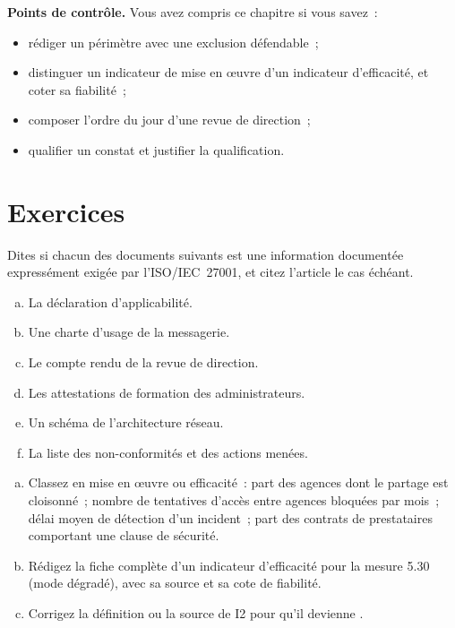 \begin{boxinfo}
\textbf{Points de contrôle.} Vous avez compris ce chapitre si vous savez~:
\begin{itemize}
    \item rédiger un périmètre avec une exclusion défendable~;
    \item distinguer un indicateur de mise en œuvre d'un indicateur
          d'efficacité, et coter sa fiabilité~;
    \item composer l'ordre du jour d'une revue de direction~;
    \item qualifier un constat et justifier la qualification.
\end{itemize}
\end{boxinfo}

\section*{Exercices}

\begin{boxexo}[title={\ding{45}\quad Exercice~11.1. Exigé ou non~? \niveaubase}]
Dites si chacun des documents suivants est une information documentée
expressément exigée par l'ISO/IEC~27001, et citez l'article le cas échéant.
\begin{enumerate}[(a)]
    \item La déclaration d'applicabilité.
    \item Une charte d'usage de la messagerie.
    \item Le compte rendu de la revue de direction.
    \item Les attestations de formation des administrateurs.
    \item Un schéma de l'architecture réseau.
    \item La liste des non-conformités et des actions menées.
\end{enumerate}
\end{boxexo}

\begin{boxexo}[title={\ding{45}\quad Exercice~11.2. Construire un indicateur \niveaumoyen}]
\begin{enumerate}[(a)]
    \item Classez en mise en œuvre ou efficacité~: part des agences dont le
          partage est cloisonné~; nombre de tentatives d'accès entre agences
          bloquées par mois~; délai moyen de détection d'un incident~; part
          des contrats de prestataires comportant une clause de sécurité.
    \item Rédigez la fiche complète d'un indicateur d'efficacité pour la
          mesure 5.30 (mode dégradé), avec sa source et sa cote de
          fiabilité.
    \item Corrigez la définition ou la source de I2 pour qu'il devienne
          \OUI{}.
\end{enumerate}
\end{boxexo}

